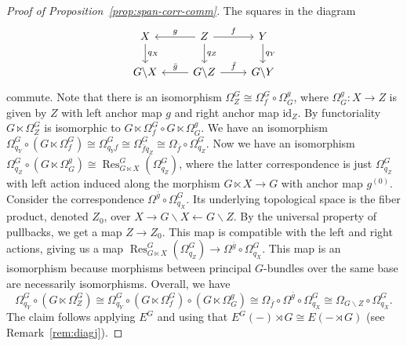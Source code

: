 \documentclass[10pt,a4paper]{amsart}
\DeclareMathOperator{\Res}{Res}
\newcommand{\id}{\mathrm{id}}
\begin{document}
\begin{proof}[Proof of Proposition~\ref{prop:span-corr-comm}]
The squares in the diagram
\[
\begin{tikzcd}
X  \arrow[d, "q_X"] & Z \arrow[l, "g"'] \arrow[r, "f"] \arrow[d, "q_Z"] & Y \arrow[d, "q_Y"] \\
G\backslash X  & G\backslash Z  \arrow[l, "\bar{g}"'] \arrow[r, "\bar{f}"]                 & G\backslash Y               
\end{tikzcd}
\]
commute.
Note that there is an isomorphism $\Omega^G_Z\cong \Omega^G_f\circ \Omega_G^g$, where $\Omega_G^g\colon X\to Z$ is given by $Z$ with left anchor map $g$ and right anchor map $\id_Z$. By functoriality $ G\ltimes \Omega^G_Z$ is isomorphic to $G\ltimes \Omega^G_f\circ G\ltimes \Omega_G^g$. 
We have an isomorphism $\Omega^{G}_{q_Y}\circ (G\ltimes \Omega^G_f) \cong \Omega^G_{q_Y f} \cong \Omega^G_{\bar{f} q_Z}\cong \Omega_{\bar{f}}\circ \Omega^G_{q_Z}$. Now we have an isomorphism $\Omega^G_{q_Z}\circ (G\ltimes \Omega^g_G)\cong \Res^G_{G\ltimes X}(\Omega^G_{q_Z})$, where the latter correspondence is just $\Omega^G_{q_Z}$ with left action induced along the morphism $G\ltimes X \to G$ with anchor map $g^{(0)}$. Consider the correspondence $\Omega^{\bar{g}}\circ \Omega^G_{q_X}$. Its underlying topological space is the fiber product, denoted $Z_0$, over $X \to G\backslash X \leftarrow G\backslash Z$. By the universal property of pullbacks, we get a map $Z\to Z_0$. This map is compatible with the left and right actions, giving us a map $\Res^G_{G\ltimes X}(\Omega^G_{q_Z})\to \Omega^{\bar{g}}\circ \Omega^G_{q_X}$. This map is an isomorphism because morphisms between principal $G$-bundles over the same base are necessarily isomorphisms. Overall, we have
 \[
\Omega^{G}_{q_Y}\circ (G\ltimes \Omega^G_Z) \cong \Omega^{G}_{q_Y}\circ (G\ltimes \Omega^G_f)\circ (G\ltimes \Omega^g_G) \cong \Omega_{\bar{f}}\circ \Omega^{\bar{g}}\circ \Omega^G_{q_X}\cong \Omega_{G\backslash Z}\circ \Omega^G_{q_X}.
\]
The claim follows applying $E^G$ and using that $E^G(-)\rtimes G \cong E(- \rtimes G)$ (see Remark~\ref{rem:diagj}).
\end{proof}
\end{document}
